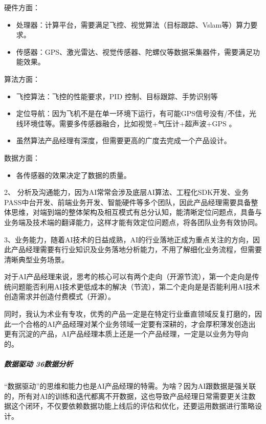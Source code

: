 \documentclass[letterpaper,11pt,english]{sphinxmanual}
\begin{document}

硬件方面：
\begin{itemize}
\item {} 
处理器：计算平台，需要满足飞控、视觉算法（目标跟踪、Vslam等）算力要求。

\item {} 
传感器：GPS、激光雷达、视觉传感器、陀螺仪等数据采集器件，需要满足功能效果。

\end{itemize}

算法方面：
\begin{itemize}
\item {} 
飞控算法：飞控的性能要求，PID 控制、目标跟踪、手势识别等

\item {} 
定位导航：因为飞机不是在单一环境下运行，有可能GPS信号没有/不佳，光线环境佳等。需要多传感器融合，比如视觉+气压计+超声波+GPS
。

\item {} 
虽然算法产品经理有深度，但需要更高的广度去完成一个产品设计。

\end{itemize}

数据方面：
\begin{itemize}
\item {} 
各传感器的效果决定了数据的质量。

\end{itemize}

2、
分析及沟通能力，因为AI常常会涉及底层AI算法、工程化SDK开发、业务PASS中台开发、前端业务开发、智能硬件等多个团队，因此产品经理需要具备整体思维，对端到端的整体架构及相互模式有总分认知，能清晰定位问题点，具备与业务端及技术端的翻译能力，这样才能有效定位问题点，将各团队业务有效协同。

3、业务能力，随着AI技术的日益成熟，AI的行业落地正成为重点关注的方向，因此产品经理需要有行业知识及业务落地分析能力，不用了解细化业务流程，但需要清晰典型业务场景。

对于AI产品经理来说，思考的核心可以有两个走向（开源节流），第一个走向是传统问题能否利用AI技术更低成本的解决（节流），第二个走向是是否能利用AI技术创造需求并创造付费模式（开源）。

同时，我认为术业有专攻，优秀的产品一定是在特定行业垂直领域反复打磨的，因此一个合格的AI产品经理对某个业务领域一定要有深耕的，才会厚积薄发创造出更有沉淀的产品，AI产品经理本质上还是一个产品经理，一定是以业务为导向的。


\subparagraph{数据驱动 36\sphinxfootnotemark[236] 数据分析}
\label{\detokenize{chapter_introduction/AI_PM:data-analysis}}%
\begin{footnotetext}[236]\sphinxAtStartFootnote
{}
%
\end{footnotetext}\ignorespaces 
“数据驱动”的思维和能力也是AI产品经理的特需。为啥？因为AI跟数据是强关联的，所有对AI的训练和迭代都离不开数据，这也导致产品经理日常需要更关注数据这个闭环，不仅要依赖数据功能上线后的评估和优化，还要运用数据进行策略设计。
\end{document}
